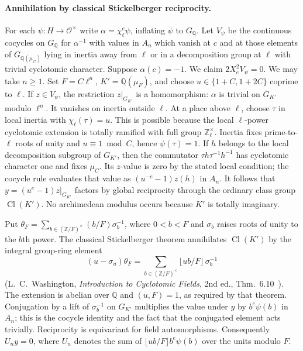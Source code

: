 \paragraph{Annihilation by classical Stickelberger reciprocity.}
For each $\psi:H\to\mathcal O^\times$ write $\alpha=\chi_\ell^e\psi$,
inflating $\psi$ to $G_{\mathbb Q}$. Let $V_\psi$ be the continuous
cocycles on $G_{\mathbb Q}$ for $\alpha^{-1}$ with values in $A_n$
which vanish at $c$ and at those elements of $G_{\mathbb Q(\mu_C)}$
lying in inertia away from $\ell$ or in a decomposition group at
$\ell$ with trivial cyclotomic character. Suppose $\alpha(c)=-1$.
We claim $2X_e^2 V_\psi=0$. We may take $n\ge1$.
Set $F=C\ell^n$, $K'=\mathbb Q(\mu_F)$, and choose
$u\in\{1+C,1+2C\}$ coprime to $\ell$.
If $z\in V_\psi$, the restriction $z|_{G_{K'}}$ is a homomorphism:
$\alpha$ is trivial on $G_{K'}$ modulo $\ell^n$. It vanishes on
inertia outside $\ell$. At a place above $\ell$, choose $\tau$ in
local inertia with $\chi_\ell(\tau)=u$. This is possible because the
local $\ell$-power cyclotomic extension is totally ramified with full
group $\mathbb Z_\ell^\times$. Inertia fixes prime-to-$\ell$ roots of
unity and $u\equiv1\bmod C$, hence $\psi(\tau)=1$.
If $h$ belongs to the local decomposition subgroup of $G_{K'}$,
then the commutator $\tau h\tau^{-1}h^{-1}$ has cyclotomic character one
and fixes $\mu_C$. Its $z$-value is zero by the stated local condition;
the cocycle rule evaluates that value as $(u^{-e}-1)z(h)$ in $A_n$.
It follows that $y=(u^e-1)z|_{G_{K'}}$ factors by global reciprocity
through the ordinary class group $\operatorname{Cl}(K')$.
No archimedean modulus occurs because $K'$ is totally imaginary.

Put $\theta_F=\sum_{b\in(\mathbb Z/F)^\times}(b/F)\sigma_b^{-1}$,
where $0<b<F$ and $\sigma_b$ raises roots of unity to the $b$th power.
The classical Stickelberger theorem annihilates $\operatorname{Cl}(K')$
by the integral group-ring element
\[
 (u-\sigma_u)\theta_F=\sum_{b\in(\mathbb Z/F)^\times}
                 \lfloor ub/F\rfloor\,\sigma_b^{-1}
\]
(L.~C.~Washington, \emph{Introduction to Cyclotomic Fields}, 2nd ed.,
Thm.~6.10~\cite{washington}). The extension is abelian over $\mathbb Q$ and $(u,F)=1$,
as required by that theorem. Conjugation by a lift of $\sigma_b^{-1}$
on $G_{K'}$ multiplies the value under $y$ by $b^e\psi(b)$ in $A_n$;
this is the cocycle identity and the fact that the conjugated element
acts trivially. Reciprocity is equivariant for field automorphisms.
Consequently $U_n y=0$, where $U_n$ denotes the sum of
$\lfloor ub/F\rfloor b^e\psi(b)$ over the units modulo $F$.

